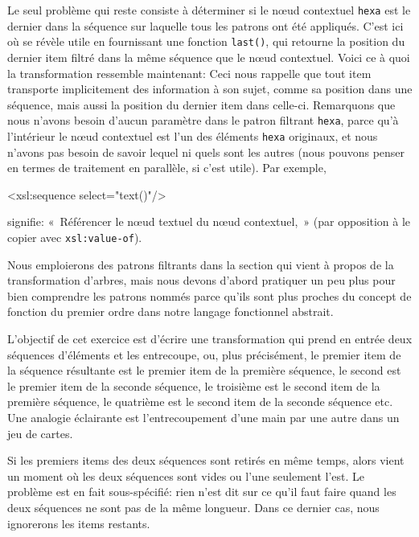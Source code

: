 Le seul problème qui reste consiste à déterminer si le n{\oe}ud
contextuel \texttt{hexa} est le dernier dans la séquence sur laquelle
tous les patrons ont été appliqués. C'est ici où \XPath se révèle
utile en fournissant une fonction \texttt{last()}, qui retourne la
position du dernier item filtré dans la même séquence que le n{\oe}ud
contextuel. Voici ce à quoi la transformation ressemble maintenant:
\noindent Ceci nous rappelle que tout item transporte implicitement
des information à son sujet, comme sa position dans une séquence, mais
aussi la position du dernier item dans celle-ci. Remarquons que nous
n'avons besoin d'aucun paramètre dans le patron filtrant
\texttt{hexa}, parce qu'à l'intérieur le n{\oe}ud contextuel est l'un
des éléments \texttt{hexa} originaux, et nous n'avons pas besoin de
savoir lequel ni quels sont les autres (nous pouvons penser en termes
de traitement en parallèle, si c'est utile). Par exemple,
\begin{sverb}
<xsl:sequence select="text()"/>
\end{sverb}
signifie: «~Référencer le n{\oe}ud textuel du n{\oe}ud contextuel,~»
(par opposition à le copier avec \texttt{xsl:value-of}).

Nous emploierons des patrons filtrants dans la section qui vient à
propos de la transformation d'arbres, mais nous devons d'abord
pratiquer un peu plus pour bien comprendre les patrons nommés parce
qu'ils sont plus proches du concept de fonction du premier ordre dans
notre langage fonctionnel abstrait.


L'objectif de cet exercice est d'écrire une transformation \XSLT qui
prend en entrée deux séquences d'éléments et les entrecoupe, ou, plus
précisément, le premier item de la séquence résultante est le premier
item de la première séquence, le second est le premier item de la
seconde séquence, le troisième est le second item de la première
séquence, le quatrième est le second item de la seconde séquence etc.
Une analogie éclairante est l'entrecoupement d'une main par une autre
dans un jeu de cartes.

Si les premiers items des deux séquences sont retirés en même temps,
alors vient un moment où les deux séquences sont vides ou l'une
seulement l'est. Le problème est en fait sous-spécifié: rien n'est dit
sur ce qu'il faut faire quand les deux séquences ne sont pas de la
même longueur. Dans ce dernier cas, nous ignorerons les items
restants.


